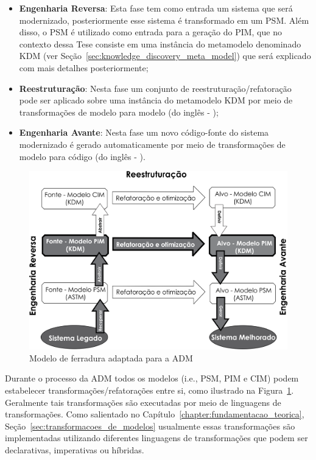 \begin{itemize}
 	\item \textbf{Engenharia Reversa}: Esta fase tem como entrada um sistema que será modernizado, posteriormente esse sistema é transformado em um PSM. Além disso, o PSM é utilizado como entrada para a geração do PIM, que no contexto dessa Tese consiste em uma instância do metamodelo denominado KDM (ver Seção~\ref{sec:knowledge_discovery_meta_model}) que será explicado com mais detalhes posteriormente;
 	\item \textbf{Reestruturação}: Nesta fase um conjunto de reestruturação/refatoração pode ser aplicado sobre uma instância do metamodelo KDM por meio de transformações de modelo para modelo (do inglês - );
 	\item \textbf{Engenharia Avante}: Nesta fase um novo código-fonte do sistema modernizado é gerado automaticamente por meio de transformações de modelo para código (do inglês - ). 
 \end{itemize} 

 \begin{figure}[htb]
 \caption{Modelo de ferradura adaptada para a ADM}
 \label{fig:horse_shoe}
 \centering
 \includegraphics[scale=0.78]{images/modelo-ferradura.png}
\end{figure}

Durante o processo da ADM todos os modelos (i.e., PSM, PIM e CIM) podem estabelecer transformações/refatorações entre si, como ilustrado na Figura~\ref{fig:horse_shoe}. Geralmente tais transformações são executadas por meio de linguagens de transformações. Como salientado no Capítulo~\ref{chapter:fundamentacao_teorica}, Seção~\ref{sec:transformacoes_de_modelos} usualmente essas transformações são implementadas utilizando diferentes linguagens de transformações que podem ser declarativas, imperativas ou híbridas. 

